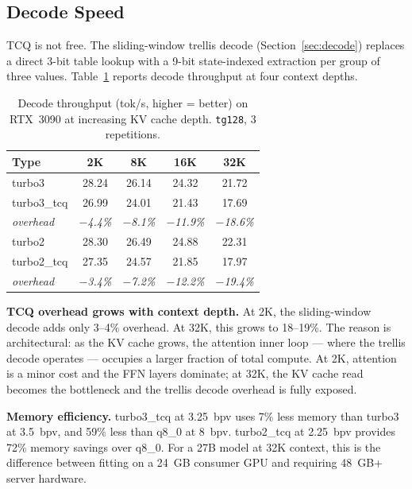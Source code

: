 \documentclass{article}
\begin{document}
\subsection{Decode Speed}
\label{sec:speed}

TCQ is not free. The sliding-window trellis decode
(Section~\ref{sec:decode}) replaces a direct 3-bit table lookup with a
9-bit state-indexed extraction per group of three values. Table~\ref{tab:speed}
reports decode throughput at four context depths.

\begin{table}[t]
\centering
\caption{Decode throughput (tok/s, higher = better) on RTX~3090 at
increasing KV cache depth. \texttt{tg128}, 3 repetitions.}
\label{tab:speed}
\begin{tabular}{@{}lcccc@{}}
\toprule
Type & 2K & 8K & 16K & 32K \\
\midrule
turbo3       & 28.24 & 26.14 & 24.32 & 21.72 \\
turbo3\_tcq  & 26.99 & 24.01 & 21.43 & 17.69 \\
\quad \emph{overhead} & \emph{$-$4.4\%} & \emph{$-$8.1\%} & \emph{$-$11.9\%} & \emph{$-$18.6\%} \\
\midrule
turbo2       & 28.30 & 26.49 & 24.88 & 22.31 \\
turbo2\_tcq  & 27.35 & 24.57 & 21.85 & 17.97 \\
\quad \emph{overhead} & \emph{$-$3.4\%} & \emph{$-$7.2\%} & \emph{$-$12.2\%} & \emph{$-$19.4\%} \\
\bottomrule
\end{tabular}
\end{table}

\textbf{TCQ overhead grows with context depth.} At 2K, the sliding-window decode
adds only 3--4\% overhead. At 32K, this grows to 18--19\%. The reason is
architectural: as the KV cache grows, the attention inner loop --- where the
trellis decode operates --- occupies a larger fraction of total compute. At 2K,
attention is a minor cost and the FFN layers dominate; at 32K, the KV cache
read becomes the bottleneck and the trellis decode overhead is fully exposed.

\textbf{Memory efficiency.} turbo3\_tcq at 3.25~bpv uses 7\% less memory than
turbo3 at 3.5~bpv, and 59\% less than q8\_0 at 8~bpv. turbo2\_tcq at 2.25~bpv
provides 72\% memory savings over q8\_0. For a 27B model at 32K context, this is
the difference between fitting on a 24~GB consumer GPU and requiring 48~GB+
server hardware.
\end{document}
